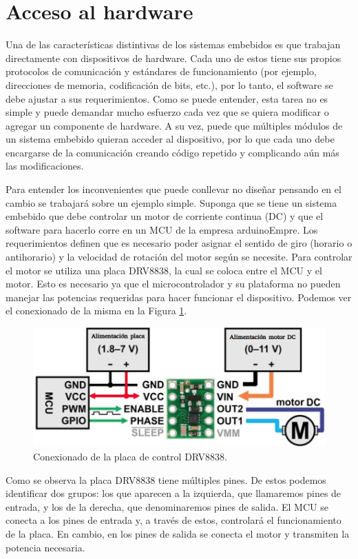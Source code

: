 \minitoc



\section{Acceso al hardware}
\label{Accesoalhardware}
Una de las características distintivas de los sistemas embebidos es que trabajan directamente con dispositivos de hardware. Cada uno de estos tiene sus propios protocolos de comunicación y estándares de funcionamiento (por ejemplo, direcciones de memoria, codificación de bits, etc.), por lo tanto, el software se debe ajustar a sus requerimientos. Como se puede entender, esta tarea no es simple y puede demandar mucho esfuerzo cada vez que se quiera modificar o agregar un componente de hardware. A su vez, puede que múltiples módulos de un sistema embebido quieran acceder al dispositivo, por lo que cada uno debe encargarse de la comunicación creando código repetido y complicando aún más las modificaciones. 

Para entender los inconvenientes que puede conllevar no diseñar pensando en el cambio se trabajará sobre un ejemplo simple. Suponga que se tiene un sistema embebido que debe controlar un motor de corriente continua (\gls{DC}) y que el software para hacerlo corre en un \gls{MCU} de la empresa \gls{arduinoEmpre}. Los requerimientos definen que es necesario poder asignar el sentido de giro (horario o antihorario) y la velocidad de rotación del motor según se necesite. Para controlar el motor se utiliza una placa \gls{DRV8838}, la cual se coloca entre el \gls{MCU} y el motor. Esto es necesario ya que el microcontrolador y su plataforma no pueden manejar las potencias requeridas para hacer funcionar el dispositivo. Podemos ver el conexionado de la misma en la Figura \ref{drv8838}.

\begin{figure}[H]
    \centering
    \includegraphics[width=0.6\linewidth]{drv8838.png}
    \caption{Conexionado de la placa de control DRV8838.}
    \label{drv8838}
\end{figure}

Como se observa la placa \gls{DRV8838} tiene múltiples pines. De estos podemos identificar dos grupos: los que aparecen a la izquierda, que llamaremos pines de entrada, y los de la derecha, que denominaremos pines de salida. El \gls{MCU} se conecta a los pines de entrada y, a través de estos, controlará el funcionamiento de la placa. En cambio, en los pines de salida se conecta el motor y transmiten la potencia necesaria.

